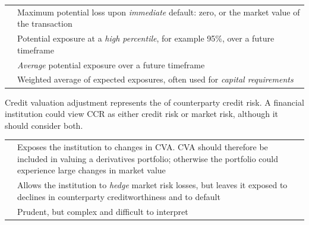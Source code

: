 \begin{center}
\footnotesize
\begin{tabular}{L{3.4cm} L{11.1cm}}
\toprule
{} &  \\
\midrule
{} & Maximum potential loss upon \emph{immediate} default:
  zero, or the market value of the transaction \\
 & Potential exposure at a \emph{high percentile}, for
  example 95\%, over a future timeframe \\
 & \emph{Average} potential exposure over a future
  timeframe \\
 & Weighted average of expected exposures,
  often used for \emph{capital requirements} \\
\bottomrule
\end{tabular}
\end{center}


Credit valuation adjustment represents the  of counterparty
credit risk. A financial institution could view CCR as either credit risk or
market risk, although it should consider both.

\begin{center}
\footnotesize
\begin{tabular}{L{3.0cm} L{11.5cm}}
\toprule
{} &  \\
\midrule
{} & Exposes the institution to changes in CVA. CVA should
  therefore be included in valuing a derivatives portfolio; otherwise the
  portfolio could experience large changes in market value \\
 & Allows the institution to \emph{hedge} market risk losses,
  but leaves it exposed to declines in counterparty creditworthiness and to
  default \\
 & Prudent, but complex and difficult to interpret \\
\bottomrule
\end{tabular}
\end{center}

